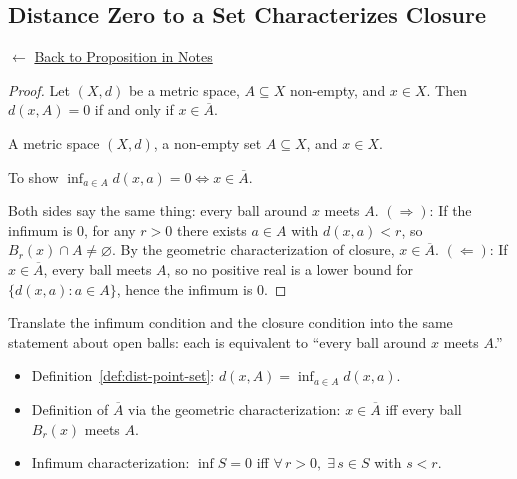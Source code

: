 
\subsection*{Distance Zero to a Set Characterizes Closure}
\label{prf:dist-point-set-closure}

\begin{remark*}[Return]
$\leftarrow$ \hyperref[prop:dist-point-set-closure]{Back to Proposition in Notes}
\end{remark*}

\begin{proof}
\Claim Let $(X,d)$ be a metric space, $A \subseteq X$ non-empty, and $x \in X$.
Then $d(x, A) = 0$ if and only if $x \in \overline{A}$.

\Given A metric space $(X,d)$, a non-empty set $A \subseteq X$, and $x \in X$.

\Goal To show $\inf_{a \in A} d(x,a) = 0 \iff x \in \overline{A}$.

\Strategy Both sides say the same thing: every ball around $x$ meets $A$.
$(\Rightarrow)$: If the infimum is $0$, for any $r > 0$ there exists $a \in A$
with $d(x,a) < r$, so $B_r(x) \cap A \neq \varnothing$.
By the geometric characterization of closure, $x \in \overline{A}$.
$(\Leftarrow)$: If $x \in \overline{A}$, every ball meets $A$, so no positive
real is a lower bound for $\{d(x,a) : a \in A\}$, hence the infimum is $0$.


\end{proof}

\begin{remark*}
Translate the infimum condition and the closure condition into the same
statement about open balls: each is equivalent to ``every ball around $x$
meets $A$.''
\end{remark*}

\begin{remark*}[Dependencies]
\begin{itemize}
  \item Definition~\ref{def:dist-point-set}: $d(x,A) = \inf_{a \in A} d(x,a)$.
  \item Definition of $\overline{A}$ via the geometric characterization:
        $x \in \overline{A}$ iff every ball $B_r(x)$ meets $A$.
  \item Infimum characterization: $\inf S = 0$ iff $\forall\, r > 0,\; \exists\, s \in S$ with $s < r$.
\end{itemize}
\end{remark*}

